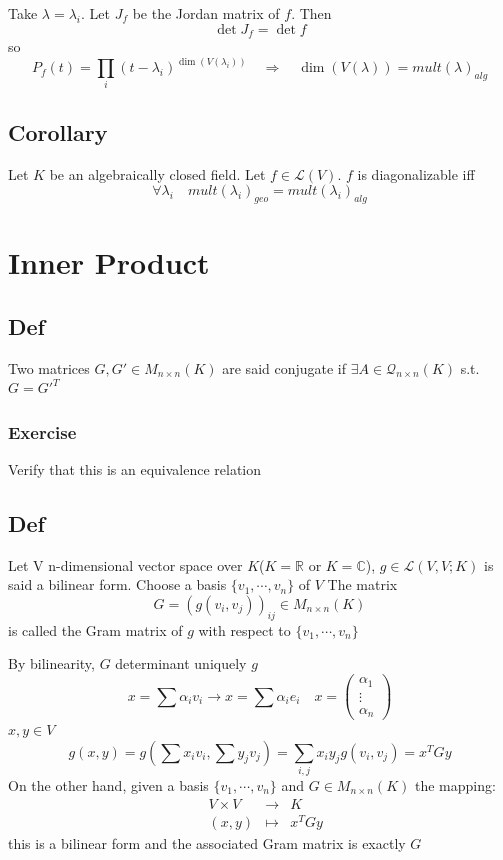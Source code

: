 \documentclass{book}
\begin{document}
Take $\lambda=\lambda_i$. Let $J_f$ be the Jordan matrix of $f$. Then $$\det J_f=\det f$$
so 
$$P_f(t)=\prod\limits_i(t-\lambda_i)^{\dim (V(\lambda_i))}\quad\Rightarrow\quad \dim(V(\lambda))=mult(\lambda)_{alg}$$
\section{Corollary}
Let $K$ be an algebraically closed field. Let $f\in \mathscr{L}(V)$. $f$ is diagonalizable iff $$\forall\lambda_i\quad mult(\lambda_i)_{geo}=mult(\lambda_i)_{alg}$$
\chapter{Inner Product}
\section{Def}Two matrices $G,G'\in M_{n\times n}(K)$ are said conjugate if $\exists A\in \mathcal{Q}_{n\times n}(K)$ s.t. $G=G'^T$
\subsection*{Exercise}
Verify that this is an equivalence relation
\section{Def}
Let V n-dimensional vector space over $K$($K=\mathbb{R}$ or $K=\mathbb{C}$), $g\in \mathscr{L}(V,V;K)$ is said a bilinear form. Choose a basis $\{v_1,\cdots,v_n\}$ of $V$ The matrix $$G=(g(v_i,v_j))_{ij}\in M_{n\times n}(K)$$ is called the Gram matrix of $g$ with respect to $\{v_1,\cdots,v_n\}$

By bilinearity, $G$ determinant uniquely $g$$$x=\sum\alpha_iv_i\rightarrow x=\sum\alpha_ie_i\quad x=\begin{pmatrix}
    \alpha_1\\\vdots\\\alpha_n
\end{pmatrix}$$
$x,y\in V$
$$g(x,y)=g(\sum x_iv_i,\sum y_jv_j)=\sum\limits_{i,j}x_iy_jg(v_i,v_j)=x^TGy$$
On the other hand, given a basis $\{v_1,\cdots,v_n\}$ and $G\in M_{n\times n}(K)$ the mapping:
$$\begin{aligned}
    &V\times V &\rightarrow &K\\
    &(x,y)&\mapsto &x^TGy
\end{aligned}$$
this is a bilinear form and the associated Gram matrix is exactly $G$
\end{document}
